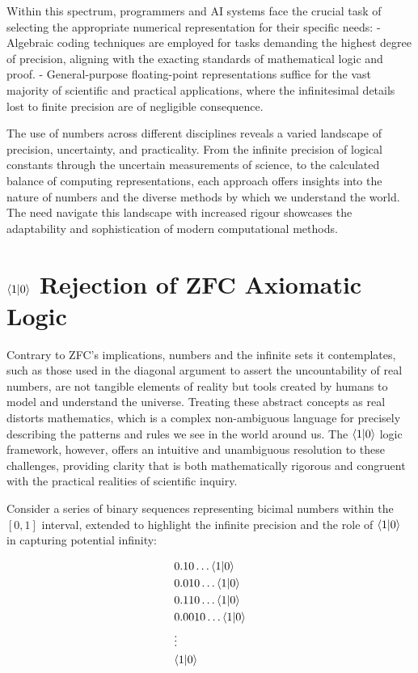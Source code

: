 \documentclass[12pt]{article}
\begin{document}
Within this spectrum, programmers and AI systems face the crucial task of selecting the appropriate numerical representation for their specific needs:
- Algebraic coding techniques are employed for tasks demanding the highest degree of precision, aligning with the exacting standards of mathematical logic and proof.
- General-purpose floating-point representations suffice for the vast majority of scientific and practical applications, where the infinitesimal details lost to finite precision are of negligible consequence.

The use of numbers across different disciplines reveals a varied landscape of precision, uncertainty, and practicality. From the infinite precision of logical constants through the uncertain measurements of science, to the calculated balance of computing representations, each approach offers insights into the nature of numbers and the diverse methods by which we understand the world. The need navigate this landscape with increased rigour showcases the adaptability and sophistication of modern computational methods.

\section*{\(\langle 1 | 0 \rangle\) Rejection of ZFC Axiomatic Logic}

Contrary to ZFC's implications, numbers and the infinite sets it contemplates, such as those used in the diagonal argument to assert the uncountability of real numbers, are not tangible elements of reality but tools created by humans to model and understand the universe. Treating these abstract concepts as real distorts mathematics, which is a complex non-ambiguous language for precisely describing the patterns and rules we see in the world around us. The \(\langle 1 | 0 \rangle\) logic framework, however, offers an intuitive and unambiguous resolution to these challenges, providing clarity that is both mathematically rigorous and congruent with the practical realities of scientific inquiry.

Consider a series of binary sequences representing bicimal numbers within the \([0,1]\) interval, extended to highlight the infinite precision and the role of \(\langle 1 | 0 \rangle\) in capturing potential infinity:

\begin{align*}
     & 0.10\ldots\langle 1 | 0 \rangle   \\
     & 0.010\ldots\langle 1 | 0 \rangle  \\
     & 0.110\ldots\langle 1 | 0 \rangle  \\
     & 0.0010\ldots\langle 1 | 0 \rangle \\
     & \vdots            \\
     & \langle 1 | 0 \rangle
\end{align*}
\end{document}
